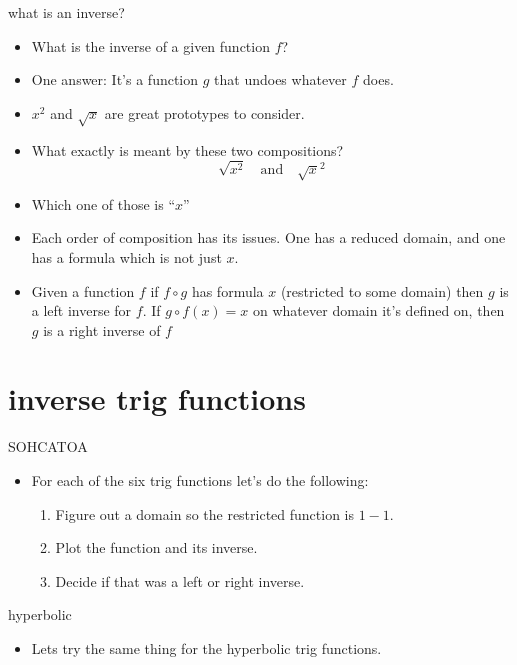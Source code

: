 \documentclass[handout,landscape]{beamer}
\begin{document}
\begin{frame}{what is an inverse?}
	\begin{itemize}
		\item What is the inverse of a given function $f$? \pause
		\item One answer: It's a function $g$ that undoes whatever $f$ does. \pause
		\item $x^2$ and $\sqrt{x}$ are great prototypes to consider. \pause
		\item What exactly is meant by these two compositions?
		\[ \sqrt{x^2} \quad \mbox{and} \quad \sqrt{x}^2 \] \pause
		\item Which one of those is ``$x$''  \pause
		\item Each order of composition has its issues.  One has a reduced domain, and one has a formula which is not just $x$. \pause
		\item Given a function $f$ if $f\circ g$ has formula $x$ (restricted to some domain) then $g$ is a left inverse for $f$.  If $g \circ f (x) = x$ on whatever domain it's defined on, then $g$ is a right inverse of $f$
	\end{itemize}
\end{frame}

\section{inverse trig functions}

\begin{frame}{SOHCATOA}
	\begin{itemize}
		\item For each of the six trig functions let's do the following: \pause
		\begin{enumerate}
			\item Figure out a domain so the restricted function is $1-1$. \pause
			\item Plot the function and its inverse. \pause
			\item Decide if that was a left or right inverse. 
		\end{enumerate}
	\end{itemize}
\end{frame}

\begin{frame}{hyperbolic}
	\begin{itemize}
		\item Lets try the same thing for the hyperbolic trig functions.
	\end{itemize}
\end{frame}
\end{document}
